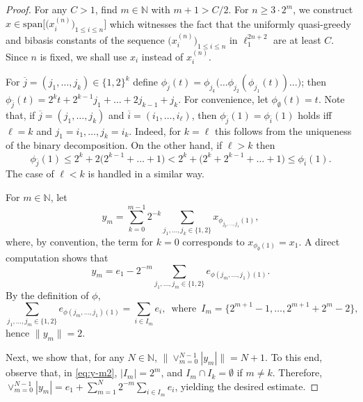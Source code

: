 \documentclass[10pt,a4paper]{amsart}
\def\N{{\mathbb N}}
\begin{document}
\begin{proof}
For any $C > 1$, find $m \in \N$ with $m+1 > C/2$.
 For $n \geq 3 \cdot 2^m$, we construct $x \in {\mathrm{span}} \big[ \big(x_i^{(n)}\big)_{1 \leq i \leq n} \big]$ which witnesses the fact that the uniformly quasi-greedy and  bibasis constants of the sequence $\big(x_i^{(n)}\big)_{1 \leq i \leq n}$ in $\ell_1^{2n+2}$ are at least $C$.
 Since $n$ is fixed, we shall use $x_i$ instead of $x_i^{(n)}$.
 \medskip

 
 For $\overline{j} = ( j_1, \ldots, j_k ) \in \{1,2\}^k$ define $\phi_{\overline{j}}(t) = \phi_{j_k} \big( \ldots \phi_{j_2}(\phi_{j_1}(t)) \ldots \big)$; then
 $\phi_{\overline{j}}(t) = 2^k t + 2^{k-1} j_1 + \ldots + 2 j_{k-1} + j_k$.
 For convenience, let $\phi_\emptyset(t) = t$.
 Note that, if $\overline{j} = ( j_1, \ldots, j_k )$ and $\overline{i} = ( i_1, \ldots, i_\ell )$, then $\phi_{\overline{j}}(1) = \phi_{\overline{i}}(1)$ holds iff $\ell = k$ and $j_1=i_1,\dots, j_k=i_k$. Indeed, for $k = \ell$ this follows from the uniqueness of the binary decomposition. On the other hand, if $\ell > k$ then
 $$
 \phi_{\overline{j}}(1) \leq 2^k + 2 \big( 2^{k-1} + \ldots + 1 \big) < 2^k + \big( 2^k + 2^{k-1} + \ldots + 1 \big) \leq \phi_{\overline{i}}(1) .
 $$
 The case of $\ell < k$ is handled in a similar way.
 \medskip
 
 For $m \in \N$, let
 $$
 y_m = \sum_{k=0}^{m-1} 2^{-k} \sum_{j_1, \ldots, j_k \in \{1,2\}} x_{\phi_{j_k, \ldots, j_1}(1)},
 $$
 where, by convention, the term for $k=0$ corresponds to $x_{\phi_\emptyset(1)} = x_1$.
 A direct computation shows that
 \begin{equation}
     \label{eq:y-m1}
 y_m = e_1 - 2^{-m} \sum_{j_1, \ldots, j_m \in \{1,2\}} e_{\phi(j_m, \ldots, j_1)(1)} .
 \end{equation}
 By the definition of $\phi$,
 \begin{equation}
     \label{eq:y-m2}
 \sum_{j_1, \ldots, j_m \in \{1,2\}} e_{\phi(j_m, \ldots, j_1)(1)} = %
 \sum_{i \in I_m} e_i, \, {\textrm{  where   }} \, I_m = \{2^{m+1}-1 , \ldots , 2^{m+1}+2^m-2 \} ,
 \end{equation}
 hence $\|y_m\| = 2$.
\medskip

 Next, we show that, for any $N \in \N$, $\| \vee_{m=0}^{N-1} |y_m| \| = N+1$. To this end, observe that, in \eqref{eq:y-m2}, $|I_m| = 2^m$, and $I_m \cap I_k = \emptyset$ if $m \neq k$. Therefore,
 $\vee_{m=0}^{N-1} |y_m| = e_1 + \sum_{m=1}^N 2^{-m} \sum_{i \in I_m} e_i$, yielding the desired estimate.
\medskip


\end{proof}
\end{document}
